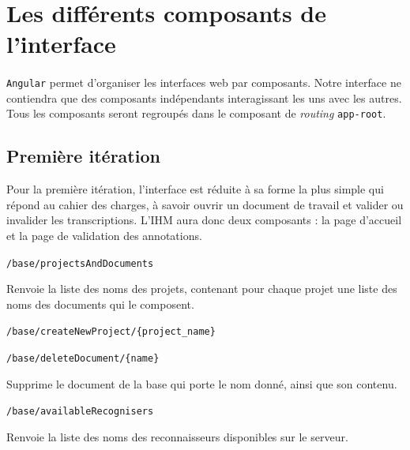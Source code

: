 
\section{Les différents composants de l'interface}

\paragraph{}
\texttt{Angular} permet d'organiser les interfaces web par composants. Notre interface ne contiendra que des composants indépendants interagissant les uns avec les autres. Tous les composants seront regroupés dans le composant de \textit{routing} \texttt{app-root}.

\subsection{Première itération}

Pour la première itération, l’interface est réduite à sa forme la plus simple qui répond au cahier des charges, à savoir ouvrir un document de travail et valider ou invalider les transcriptions. L’IHM aura donc deux composants : la page d’accueil et la page de validation des annotations.



\item [Général]

\item [GET] \texttt{/base/projectsAndDocuments}\newline{}
\begin{itshape}
Renvoie la liste des noms des projets, contenant pour chaque projet une liste des noms des documents qui le composent.
\end{itshape}

\item [POST] \texttt{/base/createNewProject/\{project\_name\}}

\item [DELETE] \texttt{/base/deleteDocument/\{name\}}\newline{}
\begin{itshape}
Supprime le document de la base qui porte le nom donné, ainsi que son contenu.
\end{itshape}

\item [GET] \texttt{/base/availableRecognisers}\newline{}
\begin{itshape}
Renvoie la liste des noms des reconnaisseurs disponibles sur le serveur.
\end{itshape}

